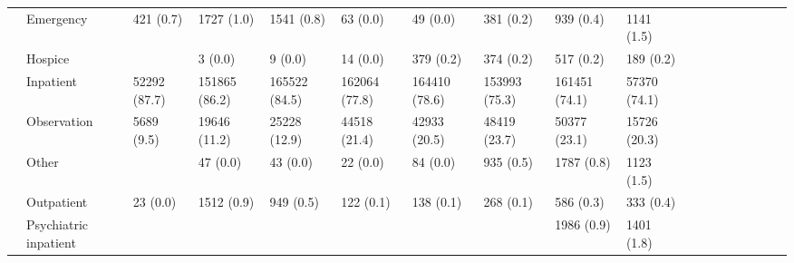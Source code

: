 \begin{tabular}{llllllllllllllllll}
                                       & Emergency &                    421 (0.7) &      1727 (1.0) &      1541 (0.8) &        63 (0.0) &        49 (0.0) &       381 (0.2) &       939 (0.4) &     1141 (1.5) &                   &                    &                    &                    &                    &                     &                     &                     \\
                                       & Hospice &                              &         3 (0.0) &         9 (0.0) &        14 (0.0) &       379 (0.2) &       374 (0.2) &       517 (0.2) &      189 (0.2) &                   &                    &                    &                    &                    &                     &                     &                     \\
                                       & Inpatient &                 52292 (87.7) &   151865 (86.2) &   165522 (84.5) &   162064 (77.8) &   164410 (78.6) &   153993 (75.3) &   161451 (74.1) &   57370 (74.1) &                   &                    &                    &                    &                    &                     &                     &                     \\
                                       & Observation &                   5689 (9.5) &    19646 (11.2) &    25228 (12.9) &    44518 (21.4) &    42933 (20.5) &    48419 (23.7) &    50377 (23.1) &   15726 (20.3) &                   &                    &                    &                    &                    &                     &                     &                     \\
                                       & Other &                              &        47 (0.0) &        43 (0.0) &        22 (0.0) &        84 (0.0) &       935 (0.5) &      1787 (0.8) &     1123 (1.5) &                   &                    &                    &                    &                    &                     &                     &                     \\
                                       & Outpatient &                     23 (0.0) &      1512 (0.9) &       949 (0.5) &       122 (0.1) &       138 (0.1) &       268 (0.1) &       586 (0.3) &      333 (0.4) &                   &                    &                    &                    &                    &                     &                     &                     \\
                                       & Psychiatric inpatient &                              &                 &                 &                 &                 &                 &      1986 (0.9) &     1401 (1.8) &                   &                    &                    &                    &                    &                     &                     &                     \\

\end{tabular}
